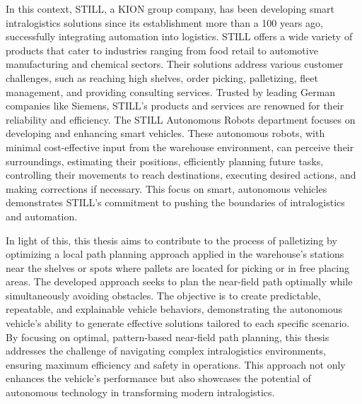 In this context, STILL, a KION group company, has been developing smart intralogistics solutions since 
its establishment more than a 100 years ago, successfully integrating automation into logistics. STILL offers a wide 
variety of products that cater to industries ranging from food retail to automotive manufacturing and chemical sectors. 
Their solutions address various customer challenges, such as reaching high shelves, order picking, palletizing, 
fleet management, and providing consulting services. Trusted by leading German companies like Siemens, STILL's products 
and services are renowned for their reliability and efficiency. The STILL Autonomous Robots department focuses on developing and enhancing smart vehicles. These autonomous robots, 
with minimal cost-effective input from the warehouse environment, can perceive their surroundings, estimating their 
positions, efficiently planning future tasks, controlling their movements to reach destinations, executing desired 
actions, and making corrections if necessary. This focus on smart, autonomous vehicles demonstrates STILL's commitment 
to pushing the boundaries of intralogistics and automation. 

In light of this, this thesis aims to contribute to the process of palletizing by optimizing a local path planning 
approach applied in the warehouse's stations near the shelves or spots where pallets are located for picking or in 
free placing areas. The developed approach seeks to plan the near-field path optimally while simultaneously avoiding 
obstacles. The objective is to create predictable, repeatable, and explainable vehicle behaviors, demonstrating the autonomous 
vehicle's ability to generate effective solutions tailored to each specific scenario. By focusing on optimal, 
pattern-based near-field path planning, this thesis addresses the challenge of navigating complex intralogistics 
environments, ensuring maximum efficiency and safety in operations. This approach not only enhances the vehicle's 
performance but also showcases the potential of autonomous technology in transforming modern intralogistics. 

